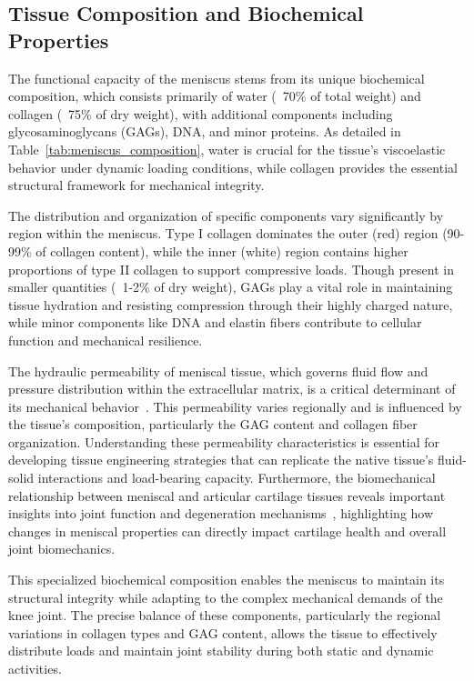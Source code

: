 \newpage
\subsection{Tissue Composition and Biochemical Properties}

The functional capacity of the meniscus stems from its unique biochemical composition, which consists primarily of water (~70\% of total weight) and collagen (~75\% of dry weight), with additional components including glycosaminoglycans (GAGs), DNA, and minor proteins. As detailed in Table~\ref{tab:meniscus_composition}, water is crucial for the tissue's viscoelastic behavior under dynamic loading conditions, while collagen provides the essential structural framework for mechanical integrity\cite{makris2011kneemeniscus,gupta2020meniscaltissue,moutos2007biomimeticthreedimensional}.

The distribution and organization of specific components vary significantly by region within the meniscus. Type I collagen dominates the outer (red) region (90-99\% of collagen content), while the inner (white) region contains higher proportions of type II collagen to support compressive loads\cite{athanasiou2009engineeringknee,bahcecioglu20193dprinted}. Though present in smaller quantities (~1-2\% of dry weight), GAGs play a vital role in maintaining tissue hydration and resisting compression through their highly charged nature, while minor components like DNA and elastin fibers contribute to cellular function and mechanical resilience\cite{vetri2019advancedmicroscopy}.

The hydraulic permeability of meniscal tissue, which governs fluid flow and pressure distribution within the extracellular matrix, is a critical determinant of its mechanical behavior~\cite{kleinhans2018hydraulicpermeability}. This permeability varies regionally and is influenced by the tissue's composition, particularly the GAG content and collagen fiber organization. Understanding these permeability characteristics is essential for developing tissue engineering strategies that can replicate the native tissue's fluid-solid interactions and load-bearing capacity. Furthermore, the biomechanical relationship between meniscal and articular cartilage tissues reveals important insights into joint function and degeneration mechanisms~\cite{mansourbiomechanicscartilage}, highlighting how changes in meniscal properties can directly impact cartilage health and overall joint biomechanics.

This specialized biochemical composition enables the meniscus to maintain its structural integrity while adapting to the complex mechanical demands of the knee joint. The precise balance of these components, particularly the regional variations in collagen types and GAG content, allows the tissue to effectively distribute loads and maintain joint stability during both static and dynamic activities\cite{makris2011kneemeniscus,vetri2019advancedmicroscopy}.

